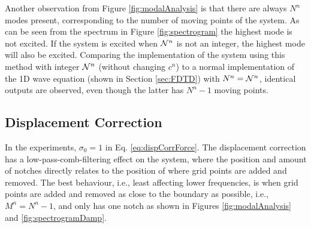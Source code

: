 Another observation from Figure \ref{fig:modalAnalysis} is that there are always $N^n$ modes present, corresponding to the number of moving points of the system. As can be seen from the spectrum in Figure \ref{fig:spectrogram} the highest mode is not excited. If the system is excited when $\mathcal{N}^n$ is not an integer, the highest mode will also be excited.
Comparing the implementation of the system using this method with integer $\mathcal{N}^n$ (without changing $c^n$) to a normal implementation of the 1D wave equation (shown in Section \ref{sec:FDTD}) with $N^n = \mathcal{N}^n$, identical outputs are observed, even though the latter has $N^n-1$ moving points.


\subsection{Displacement Correction}\label{sec:dispCorrRes}
In the experiments, $\sigma_0 = 1$ in Eq. \eqref{eq:dispCorrForce}. The displacement correction has a low-pass-comb-filtering effect on the system, where the position and amount of notches directly relates to the position of where grid points are added and removed. The best behaviour, i.e., least affecting lower frequencies, is when grid points are added and removed as close to the boundary as possible, i.e., $M^n = N^n - 1$, and only has one notch as shown in Figures \ref{fig:modalAnalysis} and \ref{fig:spectrogramDamp}.



